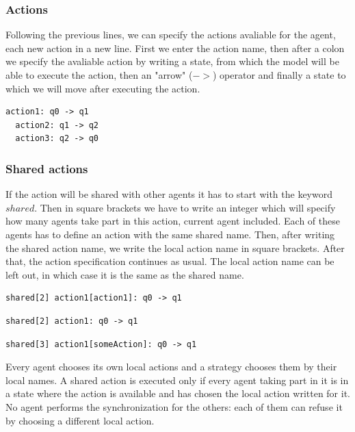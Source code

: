 \documentclass[12pt]{article}
\begin{document}
\subsubsection{Actions}
Following the previous lines, we can specify the actions avaliable for the agent, each new action in a new line.
First we enter the action name, then after a colon we specify the avaliable action by writing a state, from which the model will be able to execute the action, then an "arrow" ($->$) operator and finally a state to which we will move after executing the action.
\begin{lstlisting}[title={Making a loop out of 3 actions: action1, action2 and action3.}]
  action1: q0 -> q1
  action2: q1 -> q2
  action3: q2 -> q0
\end{lstlisting}

\subsubsection{Shared actions}
If the action will be shared with other agents it has to start with the keyword $shared$. Then in square brackets we have to write an integer which will specify how many agents take part in this action, current agent included. Each of these agents has to define an action with the same shared name. Then, after writing the shared action name, we write the local action name in square brackets. After that, the action specification continues as usual. The local action name can be left out, in which case it is the same as the shared name.
\begin{lstlisting}[title={Creating an action that will synchronize with 1 other agent.}]
  shared[2] action1[action1]: q0 -> q1
\end{lstlisting}
\begin{lstlisting}[title={A shared action equivalent to the previous one, but with a single name only.}]
  shared[2] action1: q0 -> q1
\end{lstlisting}
\begin{lstlisting}[title={Creating an action that will synchronize with 2 other agents. The current agent calls it someAction.}]
  shared[3] action1[someAction]: q0 -> q1
\end{lstlisting}

Every agent chooses its own local actions and a strategy chooses them by their local names. A shared action is executed only if every agent taking part in it is in a state where the action is available and has chosen the local action written for it. No agent performs the synchronization for the others: each of them can refuse it by choosing a different local action.
\end{document}

